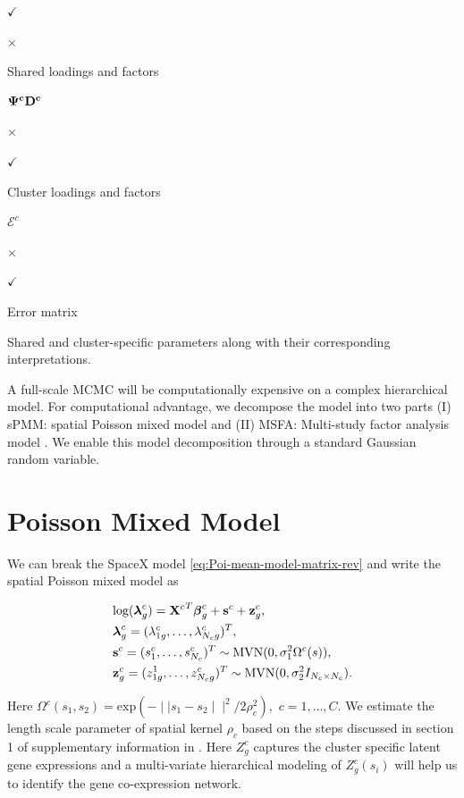 \documentclass[
]{book}
\begin{document}
\(\checkmark\)

\(\times\)

Shared loadings and factors

\(\bf \Psi^{c} D^{c}\)

\(\times\)

\(\checkmark\)

Cluster loadings and factors

\(\boldsymbol{\mathcal{E}}^{c}\)

\(\times\)

\(\checkmark\)

Error matrix

\label{tab:sharedclusterelements} Shared and cluster-specific parameters along with their corresponding interpretations.

A full-scale MCMC will be computationally expensive on a complex hierarchical model. For computational advantage, we decompose the model into two parts (I) sPMM: spatial Poisson mixed model \citep{sun2018heritability} and (II) MSFA: Multi-study factor analysis model \citep{de2018bayesian}. We enable this model decomposition through a standard Gaussian random variable.

\hypertarget{poisson-mixed-model}{%
\section{Poisson Mixed Model}\label{poisson-mixed-model}}

We can break the SpaceX model \eqref{eq:Poi-mean-model-matrix-rev} and write the spatial Poisson mixed model as

\begin{align}
\begin{split}
& \text{log}({\boldsymbol \lambda}^{c}_{g}) = {{\bf X}^{c}}^{T} {\boldsymbol \beta}^{c}_{g} + {\bf s}^{c} + {\bf z}^{c}_{g}, \\
& {\boldsymbol \lambda}^{c}_{g} = ( \lambda^{c}_{1g}, \dots , \lambda^{c}_{N_{c}g} )^{T}, \\
&{\bf s}^{c} = ( s^{c}_{1}, \dots , s^{c}_{N_{c}} )^{T} \sim \text{MVN}(0, \sigma_{1}^{2}\Omega^{c}(s)), \\
&{\bf z}^{c}_{g} = (z^{1}_{1g}, \dots , z^{c}_{N_{c}g})^{T} \sim \text{MVN}(0, \sigma_{2}^{2} I_{N_{c} \times N_{c} }).
\end{split}
\label{eq:PMM-supp}
\end{align}

Here \(\Omega^{c}(s_{1}, s_{2}) = \text{exp} (- \mid \mid s_{1} - s_{2} \mid \mid^{2} / 2 \rho^{2}_{c} ),\) \(c = 1, \dots, C\). We estimate the length scale parameter of spatial kernel \(\rho_{c}\) based on the steps discussed in section 1 of supplementary information in \citet{sun2020statistical}. Here \(Z^{c}_{g}\) captures the cluster specific latent gene expressions and a multi-variate hierarchical modeling of \(Z^{c}_{g}(s_{i})\) will help us to identify the gene co-expression network.
\end{document}
